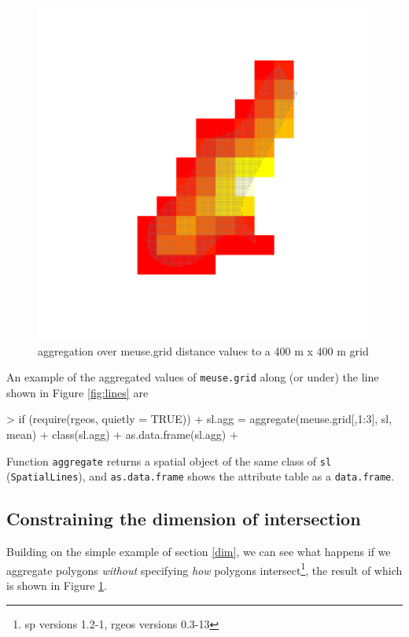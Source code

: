 \documentclass{article}
\newcommand{\code}[1]{{\tt #1}}
\begin{document}
\begin{figure}[htb]
\includegraphics{over-029}
\caption{ aggregation over meuse.grid distance values to a 400 m
x 400 m grid}
\label{fig:agg}
\end{figure}

An example of the aggregated values of \code{meuse.grid} along
(or under) the line shown in Figure \ref{fig:lines} are
\begin{Schunk}
\begin{Sinput}
> if (require(rgeos, quietly = TRUE)) {
+ sl.agg = aggregate(meuse.grid[,1:3], sl, mean)
+ class(sl.agg)
+ as.data.frame(sl.agg)
+ }
\end{Sinput}
\end{Schunk}
Function \code{aggregate} returns a spatial object of the same
class of \code{sl} (\code{SpatialLines}), and \code{as.data.frame}
shows the attribute table as a \code{data.frame}.

\subsection{Constraining the dimension of intersection}
Building on the simple example of section \ref{dim}, 
we can see what happens if we aggregate polygons {\em without}
specifying {\em how} polygons intersect\footnote{sp versions
1.2-1, rgeos versions 0.3-13}, the result of which is shown
in Figure \ref{fig:agg}.
\end{document}
